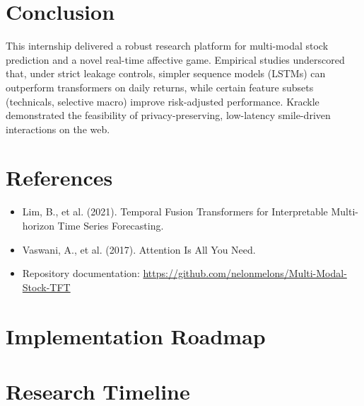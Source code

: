 \documentclass[11pt]{article}
\newcommand{\repoLink}{https://github.com/nelonmelons/Multi-Modal-Stock-TFT}
\begin{document}
\section{Conclusion}
This internship delivered a robust research platform for multi-modal stock prediction and a novel real-time affective game. Empirical studies underscored that, under strict leakage controls, simpler sequence models (LSTMs) can outperform transformers on daily returns, while certain feature subsets (technicals, selective macro) improve risk-adjusted performance. Krackle demonstrated the feasibility of privacy-preserving, low-latency smile-driven interactions on the web.

\section*{References}
\begin{itemize}
  \item Lim, B., et al. (2021). Temporal Fusion Transformers for Interpretable Multi-horizon Time Series Forecasting.
  \item Vaswani, A., et al. (2017). Attention Is All You Need.
  \item Repository documentation: \href{\repoLink}{\repoLink}
\end{itemize}

\appendix
\section{Implementation Roadmap}

\section{Research Timeline}
\end{document}
